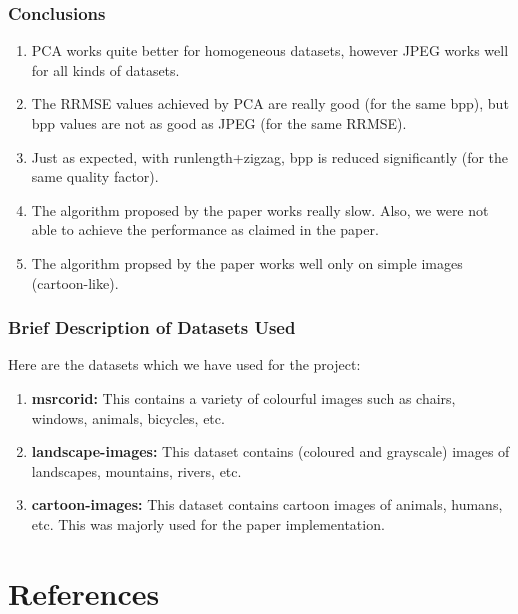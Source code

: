 \documentclass[Serif, 10pt, brown]{beamer}
\theoremstyle{example}
\theoremstyle{plain}
\begin{document}
\begin{frame}
	\frametitle{Conclusions}
	\begin{enumerate}
		\item PCA works quite better for homogeneous datasets, however JPEG works well for all kinds of datasets.
		\item The RRMSE values achieved by PCA are really good (for the same bpp), but bpp values are not as good as JPEG (for the same RRMSE).
		\item Just as expected, with runlength+zigzag, bpp is reduced significantly (for the same quality factor).
		\item The algorithm proposed by the paper works really slow. Also, we were not able to achieve the performance as claimed in the paper.
		\item The algorithm propsed by the paper works well only on simple images (cartoon-like).
	\end{enumerate}
\end{frame}

\begin{frame}
	\frametitle{Brief Description of Datasets Used}
	Here are the datasets which we have used for the project:
	\begin{enumerate}
		\item {\bf msrcorid:} This contains a variety of colourful images such as chairs, windows, animals, bicycles, etc.
		\item {\bf landscape-images:} This dataset contains (coloured and grayscale) images of landscapes, mountains, rivers, etc.
		\item {\bf cartoon-images:} This dataset contains cartoon images of animals, humans, etc. This was majorly used for the paper implementation.
	\end{enumerate}
\end{frame}

\section{References}
\end{document}
